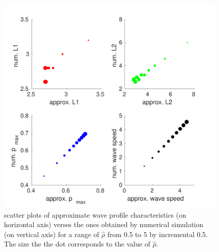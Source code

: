 \documentclass{aims}
\numberwithin{equation}{section}
\begin{document}
\begin{figure}
\begin{center}
\includegraphics[scale=0.7]{plots/scatterplot-new}
\end{center}


\caption{\label{fig:comparison-to-numerical}scatter plots of approximate wave
profile characteristics (on horizontal axis) verses the ones obtained
by numerical simulation (on vertical axis) for a range of $\hat{\rho}$
from 0.5 to 5 by incremental 0.5. The size the the dot corresponds
to the value of $\hat{\rho}$. }
\end{figure}
 
\end{document}
